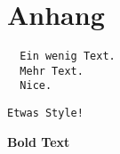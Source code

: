 \section{Anhang}
\begin{Verbatim}
  Ein wenig Text.
  Mehr Text.
  Nice.
\end{Verbatim}

\begin{Verbatim}[frame=single, label=\textit{N}\textbf{ice}!, 
       labelposition=topline, formatcom=\color{orange}, 
       framesep=2mm, framerule=2mm, fontseries=b]
  Etwas Style!
\end{Verbatim}

\textbf{Bold Text}
